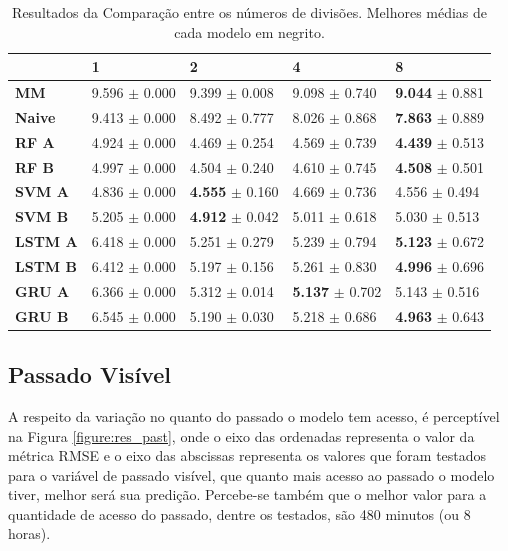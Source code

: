 \begin{table}[htbp]
    \begin{tabular*}{\linewidth}{@{\extracolsep{\fill}}lllll}
    \toprule
     & 
    \multicolumn{1}{l}{\textbf{1}} & 
    \multicolumn{1}{l}{\textbf{2}} &
    \multicolumn{1}{l}{\textbf{4}} &
    \multicolumn{1}{l}{\textbf{8}} \\
    \midrule
    \textbf{MM} & 9.596 $\pm$ 0.000 & 9.399 $\pm$ 0.008 & 9.098 $\pm$ 0.740 & \textbf{9.044} $\pm$ 0.881
    \\
    \midrule
    \textbf{Naive} & 9.413 $\pm$ 0.000 & 8.492 $\pm$ 0.777 & 8.026 $\pm$ 0.868 & \textbf{7.863} $\pm$ 0.889
    \\
    \midrule
    \textbf{RF A} & 4.924 $\pm$ 0.000 & 4.469 $\pm$ 0.254 & 4.569 $\pm$ 0.739 & \textbf{4.439} $\pm$ 0.513
    \\
    \midrule
    \textbf{RF B} & 4.997 $\pm$ 0.000 & 4.504 $\pm$ 0.240 & 4.610 $\pm$ 0.745 & \textbf{4.508} $\pm$ 0.501
    \\
    \midrule
    \textbf{SVM A} & 4.836 $\pm$ 0.000 & \textbf{4.555} $\pm$ 0.160 & 4.669 $\pm$ 0.736 & 4.556 $\pm$ 0.494
    \\
    \midrule
    \textbf{SVM B} & 5.205 $\pm$ 0.000 & \textbf{4.912} $\pm$ 0.042 & 5.011 $\pm$ 0.618 & 5.030 $\pm$ 0.513
    \\
    \midrule
    \textbf{LSTM A} & 6.418 $\pm$ 0.000 & 5.251 $\pm$ 0.279 & 5.239 $\pm$ 0.794 & \textbf{5.123} $\pm$ 0.672
    \\
    \midrule
    \textbf{LSTM B} & 6.412 $\pm$ 0.000 & 5.197 $\pm$ 0.156 & 5.261 $\pm$ 0.830 & \textbf{4.996} $\pm$ 0.696
    \\
    \midrule
    \textbf{GRU A} & 6.366 $\pm$ 0.000 & 5.312 $\pm$ 0.014 & \textbf{5.137} $\pm$ 0.702 & 5.143 $\pm$ 0.516
    \\
    \midrule
    \textbf{GRU B} & 6.545 $\pm$ 0.000 & 5.190 $\pm$ 0.030 & 5.218 $\pm$ 0.686 & \textbf{4.963} $\pm$ 0.643
    \\
    \bottomrule
    \end{tabular*}
    \label{table:res_split}
    \caption{Resultados da Comparação entre os números de divisões. Melhores médias de cada modelo em negrito.}
\end{table}

\subsection{Passado Visível}

A respeito da variação no quanto do passado o modelo tem acesso, é perceptível na Figura \ref{figure:res_past}, onde o eixo das ordenadas representa o valor da métrica \acrshort{RMSE} e o eixo das abscissas representa os valores que foram testados para o variável de passado visível, que quanto mais acesso ao passado o modelo tiver, melhor será sua predição. Percebe-se também que o melhor valor para a quantidade de acesso do passado, dentre os testados, são 480 minutos (ou 8 horas). 


